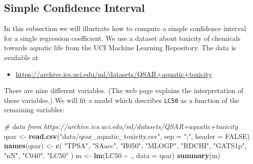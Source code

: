 \documentclass[
  a4paper,
]{article}
\newenvironment{Shaded}{\begin{snugshade}}{\end{snugshade}}
\newcommand{\AttributeTok}[1]{\textcolor[rgb]{0.13,0.29,0.53}{#1}}
\newcommand{\CommentTok}[1]{\textcolor[rgb]{0.56,0.35,0.01}{\textit{#1}}}
\newcommand{\ConstantTok}[1]{\textcolor[rgb]{0.56,0.35,0.01}{#1}}
\newcommand{\FunctionTok}[1]{\textcolor[rgb]{0.13,0.29,0.53}{\textbf{#1}}}
\newcommand{\NormalTok}[1]{#1}
\newcommand{\OtherTok}[1]{\textcolor[rgb]{0.56,0.35,0.01}{#1}}
\newcommand{\SpecialCharTok}[1]{\textcolor[rgb]{0.81,0.36,0.00}{\textbf{#1}}}
\newcommand{\StringTok}[1]{\textcolor[rgb]{0.31,0.60,0.02}{#1}}
\providecommand{\tightlist}{%
  \setlength{\itemsep}{0pt}\setlength{\parskip}{0pt}}
\theoremstyle{definition}
\theoremstyle{definition}
\theoremstyle{definition}
\theoremstyle{definition}
\theoremstyle{remark}
\begin{document}
\subsection{Simple Confidence Interval}\label{simple-confidence-interval}

In this subsection we will illustrate how to compute a simple confidence interval
for a single regression coefficient. We use a dataset about toxicity of
chemicals towards aquatic life from the UCI Machine Learning
Repository. The data is available at

\begin{itemize}
\tightlist
\item
  \url{https://archive.ics.uci.edu/ml/datasets/QSAR+aquatic+toxicity}
\end{itemize}

There are nine different variables. (The web page explains the interpretation
of these variables.) We will fit a model which describes \texttt{LC50} as a function
of the remaining variables:

\begin{Shaded}
\begin{Highlighting}[]
\CommentTok{\# data from https://archive.ics.uci.edu/ml/datasets/QSAR+aquatic+toxicity}
\NormalTok{qsar }\OtherTok{\textless{}{-}} \FunctionTok{read.csv}\NormalTok{(}\StringTok{"data/qsar\_aquatic\_toxicity.csv"}\NormalTok{, }\AttributeTok{sep =} \StringTok{";"}\NormalTok{, }\AttributeTok{header =} \ConstantTok{FALSE}\NormalTok{)}
\FunctionTok{names}\NormalTok{(qsar) }\OtherTok{\textless{}{-}} \FunctionTok{c}\NormalTok{(}
    \StringTok{"TPSA"}\NormalTok{,}
    \StringTok{"SAacc"}\NormalTok{,}
    \StringTok{"H050"}\NormalTok{,}
    \StringTok{"MLOGP"}\NormalTok{,}
    \StringTok{"RDCHI"}\NormalTok{,}
    \StringTok{"GATS1p"}\NormalTok{,}
    \StringTok{"nN"}\NormalTok{,}
    \StringTok{"C040"}\NormalTok{,}
    \StringTok{"LC50"}
\NormalTok{)}
\NormalTok{m }\OtherTok{\textless{}{-}} \FunctionTok{lm}\NormalTok{(LC50 }\SpecialCharTok{\textasciitilde{}}\NormalTok{ ., }\AttributeTok{data =}\NormalTok{ qsar)}
\FunctionTok{summary}\NormalTok{(m)}
\end{Highlighting}
\end{Shaded}
\end{document}
